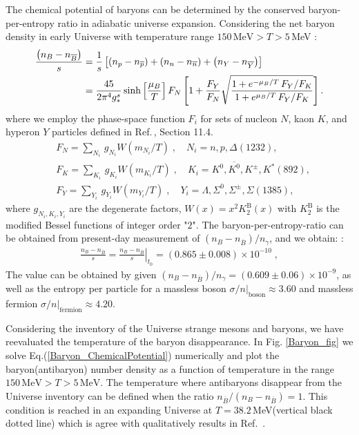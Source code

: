 \documentclass[universe,article,submit,moreauthors,pdftex,a4paper]{Definitions/mdpi}
\begin{document}
The chemical potential of baryons can be determined by the conserved baryon-per-entropy ratio in adiabatic universe expansion. Considering the net baryon density in early Universe with temperature range $150\,\mathrm{MeV}>T>5$\,MeV \cite{Yang:2021bko}:
\begin{align}\label{Baryon_ChemicalPotential}
\frac{\left(n_B-n_{\overline{B}}\right)}{s}&=\frac{1}{s}\left[\left(n_p-n_{\overline{p}}\right)+\left(n_n-n_{\overline{n}}\right)+\left(n_Y-n_{\overline{Y}}\right)\right]\notag\\
&=\frac{45}{2\pi^4g^s_\ast}\sinh\left[\frac{\mu_B}{T}\right]F_N\left[1+\frac{F_Y}{F_N}\sqrt{\frac{1+e^{-\mu_B/T}\,F_Y/F_K}{1+e^{\mu_B/T}\,F_Y/F_K}}\right].
\end{align}
where we employ the phase-space function $F_i$ for sets of nucleon $N$, kaon $K$, and hyperon $Y$ particles defined in Ref.\,\cite{Letessier:2002ony}, Section 11.4.
\begin{align}
&F_N=\sum_{N_i}\,g_{N_i}W(m_{N_i}/T)\;, \quad N_i=n, p, \Delta(1232),\\
&F_K=\sum_{K_i}\,g_{K_i}W(m_{K_i}/T)\;, \quad K_i=K^0, \overline{K^0}, K^\pm, K^\ast(892),\\
&F_Y=\sum_{Y_i}\,g_{Y_i}W(m_{Y_i}/T)\;, \quad Y_i=\Lambda, \Sigma^0,\Sigma^\pm, \Sigma(1385),
\end{align}
where $g_{N_i,K_i,Y_i}$ are the degenerate factors, $W(x)=x^2K^\mathrm{B}_2(x)$ with $K^\mathrm{B}_2$ is the modified Bessel functions of integer order "$2$". The baryon-per-entropy-ratio can be obtained from present-day measurement of $\left(n_B-n_{\overline{B}}\right)/n_\gamma$, and we obtain: \cite{Yang:2021bko}:
\begin{align}\label{BdS}
\frac{n_B-n_{\overline{B}}}{s}= \left.\frac{n_B-n_{\overline{B}}}{s}\right|_{t_0}=(0.865\pm0.008)\times10^{-10} \;,
\end{align}
The value can be obtained by given $\left(n_B-n_{\overline{B}}\right)/n_\gamma= (0.609\pm0.06)\times10^{-9}$, as well as the entropy per particle for a massless boson $\sigma/n|_\mathrm{boson}\approx 3.60$ and massless fermion $\sigma/n|_\mathrm{fermion}\approx 4.20$.

 Considering the inventory of the Universe strange mesons and baryons, we have reevaluated the temperature of the baryon disappearance.
In Fig. \ref{Baryon_fig} we solve Eq.(\ref{Baryon_ChemicalPotential}) numerically and plot the baryon(antibaryon) number density as a function of temperature in the range $150\,\mathrm{MeV}>T>5\,\mathrm{MeV}$. The temperature where antibaryons disappear from the Universe inventory can be defined when the ratio $n_{\overline B}/(n_B-n_{\overline B})=1$. This condition is reached in an expanding Universe at $T=38.2$\,MeV(vertical black dotted line) which is agree with qualitatively results in Ref.\,\cite{kolb1981early} . 
\end{document}
